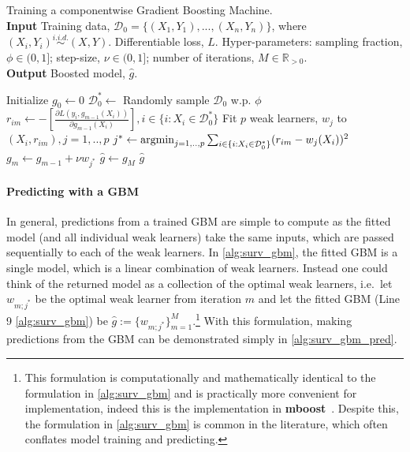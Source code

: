 \documentclass[
  letterpaper,
]{scrbook}
\let\oldparagraph\paragraph
\renewcommand{\paragraph}[1]{\oldparagraph{#1}\mbox{}}
\theoremstyle{plain}
\theoremstyle{definition}
\theoremstyle{remark}
\begin{document}
\begin{algorithm}[H]
\caption{Training a componentwise Gradient Boosting Machine. \\
\textbf{Input} Training data, $\mathcal{D}_0= \{(X_1,Y_1),...,(X_n,Y_n)\}$, where $(X_i,Y_i) \stackrel{i.i.d.}\sim(X,Y)$. Differentiable loss, $L$. Hyper-parameters: sampling fraction, $\phi \in (0,1]$; step-size, $\nu \in  (0,1]$; number of iterations, $M \in \mathbb{R}_{>0}$. \\
\textbf{Output} Boosted model, $\hat{g}$.}\label{alg:surv_gbm}
\begin{algorithmic}[1]
\State Initialize $g_0 \gets 0$
\State $\mathcal{D}_0^* \gets $ Randomly sample $\mathcal{D}_0$ w.p. $\phi$
\State $r_{im} \gets -[\frac{\partial L(y_i, g_{m-1}(X_i))}{\partial g_{m-1}(X_i)}], i \in \{i: X_i \in \mathcal{D}_0^*\}$
\State Fit $p$ weak learners, $w_j$ to $(X_i, r_{im}), j = 1,..,p$
\State $j^* \gets \operatornamewithlimits{argmin}_{j = 1,..,p} \sum_{i \in \{i: X_i \in \mathcal{D}_0^*\}}
(r_{im} - w_j(X_i))^2$
\State $g_m \gets g_{m-1} + \nu w_{j^*}$
\EndFor
\State $\hat{g}\gets g_M$
\State\Return$\hat{g}$
\end{algorithmic}
\end{algorithm}

\paragraph{Predicting with a GBM}

In general, predictions from a trained GBM are simple to compute as the
fitted model (and all individual weak learners) take the same inputs,
which are passed sequentially to each of the weak learners. In
\ref{alg:surv_gbm}, the fitted GBM is a single model, which is a linear
combination of weak learners. Instead one could think of the returned
model as a collection of the optimal weak learners, i.e.~let
\(w_{m;j^*}\) be the optimal weak learner from iteration \(m\) and let
the fitted GBM (Line 9 \ref{alg:surv_gbm}) be
\(\hat{g}:= \{w_{m;j^*}\}^M_{m=1}\).\footnote{This formulation is computationally and mathematically identical to the formulation in \ref{alg:surv_gbm} and is practically more convenient for implementation, indeed this is the implementation in \textbf{mboost}~\cite{pkgmboost}. Despite this, the formulation in \ref{alg:surv_gbm} is common in the literature, which often conflates model training and predicting.}
With this formulation, making predictions from the GBM can be
demonstrated simply in \ref{alg:surv_gbm_pred}.
\end{document}
